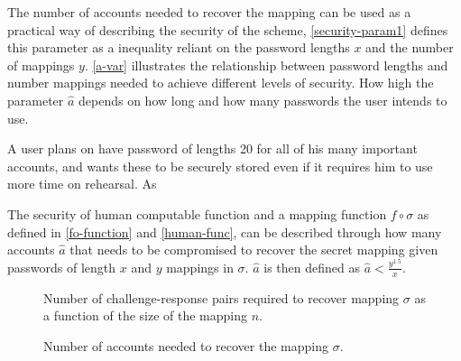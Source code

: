\par The number of accounts needed to recover the mapping can be used as a practical way of describing the security of the scheme, \autoref{security-param1} defines this parameter as a inequality reliant on the password lengths $x$ and the number of mappings $y$. \autoref{a-var} illustrates the relationship between password lengths and number mappings needed to achieve different levels of security. How high the parameter $\hat a$ depends on how long and how many passwords the user intends to use. 
\begin{example}
A user plans on have password of lengths 20 for all of his many important accounts, and wants these to be securely stored even if it requires him to use more time on rehearsal. As 
\end{example}


\begin{theorem}
    \label{security-param1}
    The security of human computable function and a mapping function $f \circ \sigma$ as defined in \autoref{fo-function} and \autoref{human-func}, can be described through how many accounts $\hat a$ that needs to be compromised to recover the secret mapping given passwords of length $x$ and $y$ mappings in $\sigma$. $\hat a$ is then defined as
    $ \hat a < \frac{y^{ 1.5 }}{x} $.
\end{theorem}

\begin{figure}
\caption{Number of challenge-response pairs required to recover mapping $\sigma$ as a function of the size of the mapping $n$. }
\label{trade-off1}
\end{figure}

\begin{figure}
\caption{Number of accounts needed to recover the mapping $\sigma$.}
\label{trade-off2}
\end{figure}


